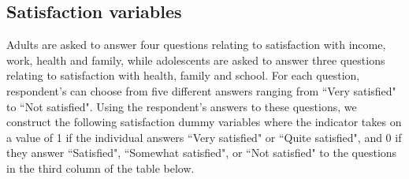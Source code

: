 \subsection{Satisfaction variables}

Adults are asked to answer four questions relating to satisfaction with income, work, health and family, while adolescents are asked to answer three questions relating to satisfaction with health, family and school. For each question, respondent's can choose from five different answers ranging from ``Very satisfied" to ``Not satisfied". Using the respondent's answers to these questions, we construct the following satisfaction dummy variables where the indicator takes on a value of 1 if the individual answers ``Very satisfied" or ``Quite satisfied", and 0 if they answer ``Satisfied", ``Somewhat satisfied", or ``Not satisfied" to the questions in the third column of the table below.

\begin{table}[H]
\begin{center}
\end{center}
\end{table}


